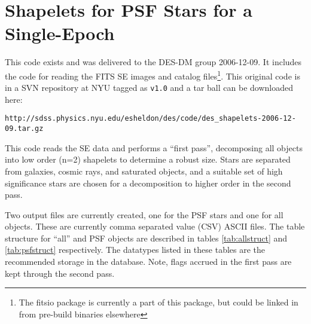\documentclass[12pt]{article}
\begin{document}
\section{Shapelets for PSF Stars for a Single-Epoch} \label{sec:sepsf}


This code exists and was delivered to the DES-DM group 2006-12-09.  It includes
the code for reading the FITS SE images and catalog files\footnote{The fitsio
package is currently a part of this package, but could be linked in from
pre-build binaries elsewhere}.  This original code is in a SVN repository at
NYU tagged as \texttt{v1.0} and a tar ball can be downloaded here:
\begin{verbatim}
http://sdss.physics.nyu.edu/esheldon/des/code/des_shapelets-2006-12-09.tar.gz
\end{verbatim}

This code reads the SE data and performs a ``first pass'', decomposing all
objects into low order (n=2) shapelets to determine a robust size. Stars are
separated from galaxies, cosmic rays, and saturated objects, and a suitable set
of high significance stars are chosen for a decomposition to higher order
in the second pass.

Two output files are currently created, one for the PSF stars and one for all
objects.  These are currently comma separated value (CSV) ASCII files.  The
table structure for ``all'' and PSF objects are described in tables
\ref{tab:allstruct} and \ref{tab:psfstruct} respectively.  The datatypes listed
in these tables are the recommended storage in the database. Note, flags
accrued in the first pass are kept through the second pass.
\end{document}
